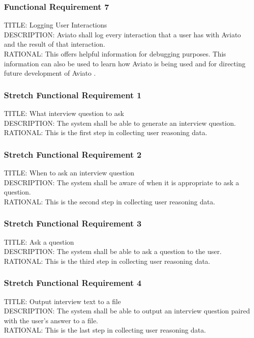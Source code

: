\documentclass[onecolumn, draftclsnofoot,10pt, compsoc]{IEEEtran}
\def \botname{Aviato }
\begin{document}
        \subsubsection{Functional Requirement 7}
        TITLE: Logging User Interactions \\
        DESCRIPTION: \botname shall log every interaction that a user has with \botname and the result of that interaction. \\
        RATIONAL: This offers helpful information for debugging purposes. This information can also be used to learn how \botname is being used and for directing future development of \botname.
        
        
        \subsubsection{Stretch Functional Requirement 1}
        TITLE: What interview question to ask \\
        DESCRIPTION: The system shall be able to generate an interview question. \\
        RATIONAL: This is the first step in collecting user reasoning data.  
        
        \subsubsection{Stretch Functional Requirement 2}
        TITLE: When to ask an interview question \\
        DESCRIPTION: The system shall be aware of when it is appropriate to ask a question. \\
        RATIONAL: This is the second step in collecting user reasoning data. 
        
        \subsubsection{Stretch Functional Requirement 3}
        TITLE: Ask a question \\
        DESCRIPTION: The system shall be able to ask a question to the user. \\
        RATIONAL: This is the third step in collecting user reasoning data. 
        
        \subsubsection{Stretch Functional Requirement 4}
        TITLE: Output interview text to a file \\
        DESCRIPTION: The system shall be able to output an interview question paired with the user's answer to a file. \\
        RATIONAL: This is the last step in collecting user reasoning data. 
        
\end{document}
